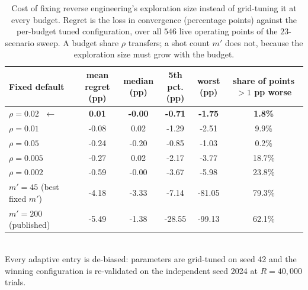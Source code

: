 \begin{table}[ht]
\centering
\small
\caption{Cost of fixing reverse engineering's exploration size instead of grid-tuning it at every budget. Regret is the loss in convergence (percentage points) against the per-budget tuned configuration, over all $546$ live operating points of the $23$-scenario sweep. A budget share $\rho$ transfers; a shot count $m'$ does not, because the exploration size must grow with the budget.}
\label{tab:pilot-share}
\begin{tabular}{lccccc}
\toprule
Fixed default
& \makecell{mean \\ regret (pp)}
& \makecell{median \\ (pp)}
& \makecell{5th pct. \\ (pp)}
& \makecell{worst \\ (pp)}
& \makecell{share of points \\ $>1$ pp worse} \\
\midrule
\textbf{$\rho=0.02$} $\;\leftarrow$
& \textbf{0.01}
& \textbf{-0.00}
& \textbf{-0.71}
& \textbf{-1.75}
& \textbf{1.8\%} \\
$\rho=0.01$
& -0.08
& 0.02
& -1.29
& -2.51
& 9.9\% \\
$\rho=0.05$
& -0.24
& -0.20
& -0.85
& -1.03
& 0.2\% \\
$\rho=0.005$
& -0.27
& 0.02
& -2.17
& -3.77
& 18.7\% \\
$\rho=0.002$
& -0.59
& -0.00
& -3.67
& -5.98
& 23.8\% \\
$m'=45$ (best fixed $m'$)
& -4.18
& -3.33
& -7.14
& -81.05
& 79.3\% \\
$m'=200$ (published)
& -5.49
& -1.38
& -28.55
& -99.13
& 62.1\% \\
\bottomrule
\end{tabular}
\\[2pt]
\footnotesize Every adaptive entry is de-biased: parameters are grid-tuned on seed 42 and the winning configuration is re-validated on the independent seed 2024 at $R=40{,}000$ trials.
\end{table}
